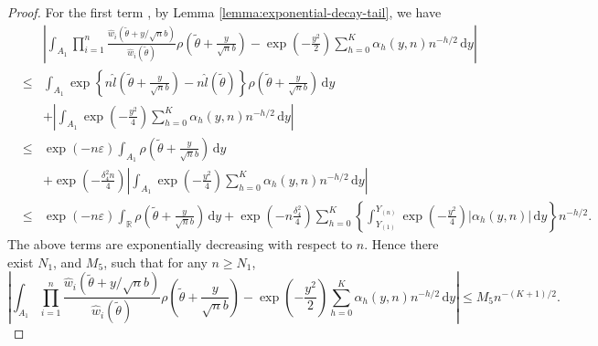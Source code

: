 \documentclass[oneside,english]{amsbook}
\numberwithin{section}{chapter}
\numberwithin{equation}{section}
\numberwithin{figure}{section}
\theoremstyle{plain}
\theoremstyle{plain}
\theoremstyle{definition}
\theoremstyle{plain}
\theoremstyle{plain}
\theoremstyle{remark}
\theoremstyle{definition}
\theoremstyle{definition}
\newcommand{\diff}{\,\mathrm{d}}
\begin{document}
\begin{proof}
For the first term%
, by Lemma \ref{lemma:exponential-decay-tail}, we have
\begin{eqnarray*}
 &  & \left|\int_{A_{1}}\prod_{i=1}^{n}\frac{\hat{w}_{i}\left(\tilde{\theta}+y/\sqrt{n}b\right)}{\hat{w}_{i}\left(\tilde{\theta}\right)}\rho\left(\tilde{\theta}+\frac{y}{\sqrt{n}b}\right)-\exp\left(-\frac{y^{2}}{2}\right)\sum_{h=0}^{K}\alpha_{h}\left(y,n\right)n^{-h/2}\diff y\right|\\
 & \le & \int_{A_{1}}\exp\left\{ n\hat{l}\left(\tilde{\theta}+\frac{y}{\sqrt{n}b}\right)-n\hat{l}\left(\tilde{\theta}\right)\right\} \rho\left(\tilde{\theta}+\frac{y}{\sqrt{n}b}\right)\diff y\\
 &  & +\left|\int_{A_{1}}\exp\left(-\frac{y^{2}}{4}\right)\sum_{h=0}^{K}\alpha_{h}\left(y,n\right)n^{-h/2}\diff y\right|\\
 & \le & \exp\left(-n\varepsilon\right)\int_{A_{1}}\rho\left(\tilde{\theta}+\frac{y}{\sqrt{n}b}\right)\diff y\\
 &  & +\exp\left(-\frac{\delta_{4}^{2}n}{4}\right)\left|\int_{A_{1}}\exp\left(-\frac{y^{2}}{4}\right)\sum_{h=0}^{K}\alpha_{h}\left(y,n\right)n^{-h/2}\diff y\right|\\
 & \le & \exp\left(-n\varepsilon\right)\int_{\mathbb{R}}\rho\left(\tilde{\theta}+\frac{y}{\sqrt{n}b}\right)\diff y+\exp\left(-n\frac{\delta_{4}^{2}}{4}\right)\sum_{h=0}^{K}\left\{ \int_{Y_{\left(1\right)}}^{Y_{\left(n\right)}}\exp\left(-\frac{y^{2}}{4}\right)\left|\alpha_{h}\left(y,n\right)\right|\diff y\right\} n^{-h/2}.
\end{eqnarray*}
The above terms are exponentially decreasing with respect to $n$.
Hence there exist  $N_{1}$, and $M_{5}$, such that for any $n\ge N_{1}$,
\[
\left|\int_{A_{1}}\prod_{i=1}^{n}\frac{\hat{w}_{i}\left(\tilde{\theta}+y/\sqrt{n}b\right)}{\hat{w}_{i}\left(\tilde{\theta}\right)}\rho\left(\tilde{\theta}+\frac{y}{\sqrt{n}b}\right)-\exp\left(-\frac{y^{2}}{2}\right)\sum_{h=0}^{K}\alpha_{h}\left(y,n\right)n^{-h/2}\diff y\right|\le M_{5}n^{-\left(K+1\right)/2}.
\]



\end{proof}
\end{document}
